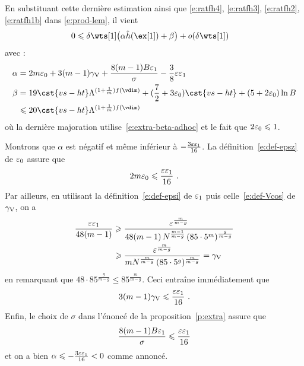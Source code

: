 En substituant cette dernière estimation ainsi que \eqref{e:ratfh4},
\eqref{e:ratfh3}, \eqref{e:ratfh2}, \eqref{e:ratfh1b} dans \eqref{e:prod-lem},
il vient
\begin{align} \label{e:prod-lem-final}
  0
  & \le
  \delta \wts[1] \bigl(
    \alpha \hautn{\ex[1]} + \beta
  \bigr) + o(\delta \wts[1])
\end{align}
avec : %
\begin{align}
  \alpha
  & =
  2 m \epsz
  + 3 (m - 1) \Vcos
  + \frac{8 (m - 1) B \epsi}{\sigma}
  - \frac38 \eps \epsi
  \\
  \beta
  & =
  19 \cst{vs-ht} \Lambda^{(1 + \frac1m) f(\vdim)}
  + (\frac72 + 3\epsz) \cst{vs-ht} + (5 + 2\epsz) \ln B
  \\ & \le
  20 \cst{vs-ht} \Lambda^{(1 + \frac1m) f(\vdim)}
\end{align}
où la dernière majoration utilise~\eqref{e:extra-beta-adhoc} et le fait que \(
  2 \varepsilon\sb0 \leqslant 1 \).

Montrons que \( \alpha \) est négatif et même
inférieur à \( - \frac{3\varepsilon \varepsilon\sb1}{16} \). La définition~\eqref{e:def-epsz}
de \( \varepsilon\sb0 \) assure que
\begin{equation} \label{e:epsz-ct-extra}
  2 m \varepsilon\sb0
  \leqslant \frac{\varepsilon \varepsilon\sb1}{16}
  \text{ .}
\end{equation}
Par ailleurs, en utilisant la définition~\eqref{e:def-epsi} de \( \varepsilon\sb1 \)
puis celle~\eqref{e:def-Vcos} de \( \gamma \sb{\mathrm{V}} \), on a
\begin{align} \label{e:Vcos-ct-details}
  \frac{ \varepsilon \varepsilon\sb1 }{ 48 (m - 1) }
  & \geqslant
  \frac{
    \varepsilon^{ \frac{m}{m-g} }
  }{
    48 (m - 1)
    \, N^{ \frac{m-1}{m-g} }
    \, (85 \cdot 5^m)^{ \frac{g}{m-g} }
  }
  \\ & \geqslant
  \frac{
    \varepsilon^{ \frac{m}{m-g} }
  }{
    m
    N^{ \frac{m}{m-g} }
    \, (85 \cdot 5^g)^{ \frac{m}{m-g} }
  }
  =
  \gamma \sb{\mathrm{V}}
\end{align}
en remarquant que \( 48 \cdot 85^{ \frac{g}{m-g} } \le 85^{
    \frac{m}{m-g} } \). Ceci entraîne immédiatement que
\begin{equation} \label{e:Vcos-ct-extra}
  3 (m-1) \gamma \sb{\mathrm{V}}
  \leqslant \frac{\varepsilon \varepsilon\sb1}{16}
  \text{ .}
\end{equation}
Enfin, le choix de \( \sigma \) dans l'énoncé de la proposition~\vref{p:extra}
assure que
\begin{equation} \label{e:ct-sigma}
  \frac{8 (m - 1) B \varepsilon\sb1}{\sigma}
  \leqslant \frac{\varepsilon \varepsilon\sb1}{16}
\end{equation}
et on a bien \( \alpha \leqslant - \frac{3\varepsilon \varepsilon\sb1}{16} < 0 \) comme annoncé.

